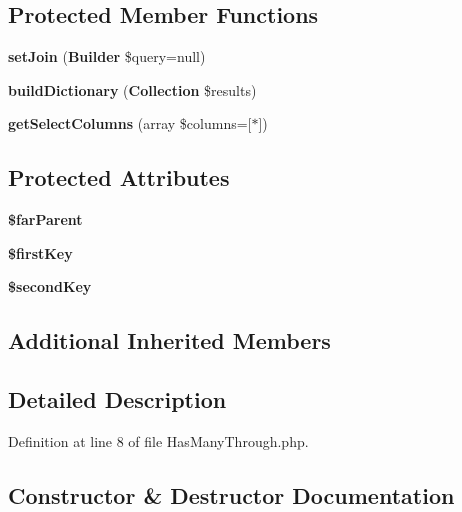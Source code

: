 \subsection*{Protected Member Functions}
\begin{DoxyCompactItemize}
\item 
{\bf set\+Join} ({\bf Builder} \$query=null)
\item 
{\bf build\+Dictionary} ({\bf Collection} \$results)
\item 
{\bf get\+Select\+Columns} (array \$columns=[\textquotesingle{}$\ast$\textquotesingle{}])
\end{DoxyCompactItemize}
\subsection*{Protected Attributes}
\begin{DoxyCompactItemize}
\item 
{\bf \$far\+Parent}
\item 
{\bf \$first\+Key}
\item 
{\bf \$second\+Key}
\end{DoxyCompactItemize}
\subsection*{Additional Inherited Members}


\subsection{Detailed Description}


Definition at line 8 of file Has\+Many\+Through.\+php.



\subsection{Constructor \& Destructor Documentation}
